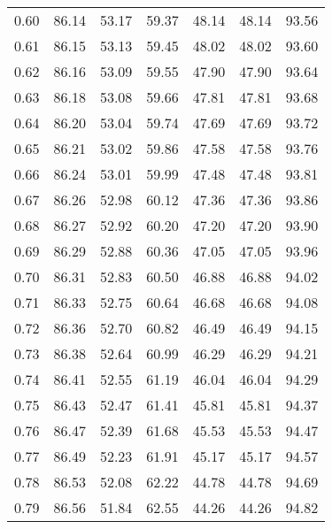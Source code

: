 \begin{tabular}{|c|c|c|c|c|c|c|}
      0.60 &     86.14 &     53.17 &      59.37 &   48.14 &      48.14 &         93.56 \\
      0.61 &     86.15 &     53.13 &      59.45 &   48.02 &      48.02 &         93.60 \\
      0.62 &     86.16 &     53.09 &      59.55 &   47.90 &      47.90 &         93.64 \\
      0.63 &     86.18 &     53.08 &      59.66 &   47.81 &      47.81 &         93.68 \\
      0.64 &     86.20 &     53.04 &      59.74 &   47.69 &      47.69 &         93.72 \\
      0.65 &     86.21 &     53.02 &      59.86 &   47.58 &      47.58 &         93.76 \\
      0.66 &     86.24 &     53.01 &      59.99 &   47.48 &      47.48 &         93.81 \\
      0.67 &     86.26 &     52.98 &      60.12 &   47.36 &      47.36 &         93.86 \\
      0.68 &     86.27 &     52.92 &      60.20 &   47.20 &      47.20 &         93.90 \\
      0.69 &     86.29 &     52.88 &      60.36 &   47.05 &      47.05 &         93.96 \\
      0.70 &     86.31 &     52.83 &      60.50 &   46.88 &      46.88 &         94.02 \\
      0.71 &     86.33 &     52.75 &      60.64 &   46.68 &      46.68 &         94.08 \\
      0.72 &     86.36 &     52.70 &      60.82 &   46.49 &      46.49 &         94.15 \\
      0.73 &     86.38 &     52.64 &      60.99 &   46.29 &      46.29 &         94.21 \\
      0.74 &     86.41 &     52.55 &      61.19 &   46.04 &      46.04 &         94.29 \\
      0.75 &     86.43 &     52.47 &      61.41 &   45.81 &      45.81 &         94.37 \\
      0.76 &     86.47 &     52.39 &      61.68 &   45.53 &      45.53 &         94.47 \\
      0.77 &     86.49 &     52.23 &      61.91 &   45.17 &      45.17 &         94.57 \\
      0.78 &     86.53 &     52.08 &      62.22 &   44.78 &      44.78 &         94.69 \\
      0.79 &     86.56 &     51.84 &      62.55 &   44.26 &      44.26 &         94.82 \\

\end{tabular}
